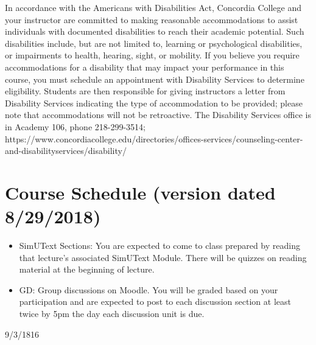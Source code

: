 \documentclass{tufte-handout}
\begin{document}
\begin{fullwidth}
In accordance with the Americans with Disabilities Act, Concordia College and your instructor are committed to making reasonable accommodations to assist individuals with documented disabilities to reach their academic potential. Such disabilities include, but are not limited to, learning or psychological disabilities, or impairments to health, hearing, sight, or mobility. If you believe you require accommodations for a disability that may impact your performance in this course, you must schedule an appointment with Disability Services to determine eligibility. Students are then responsible for giving instructors a letter from Disability Services indicating the type of accommodation to be provided; please note that accommodations will not be retroactive. The Disability Services office is in Academy 106, phone 218-299-3514; https://www.concordiacollege.edu/directories/offices-services/counseling-center-and-disabilityservices/disability/ 



\newpage

\section{Course Schedule (version dated 8/29/2018)}

\begin{itemize}
	\item SimUText Sections: You are expected to come to class prepared by reading that lecture's associated SimUText Module.  There will be quizzes on reading material at the beginning of lecture.
	\item GD: Group discussions on Moodle. You will be graded based on your participation and are expected to post to each discussion section at least twice by 5pm the day each discussion unit is due.
\end{itemize}



  \setlength{\calwidth}{6.5in}
  \setlength{\calboxdepth}{0.3in}
  \begin{calendar}{9/3/18}{16}

  \calday[Monday]{\classday} %
  \calday[Tuesday]{\classday} %
  \calday[Wednesday]{\classday}
  \calday[Thursday]{\classday} %
  \calday[Friday]{\classday} %
    \skipday\skipday %



\end{calendar}
\end{fullwidth}
\end{document}
